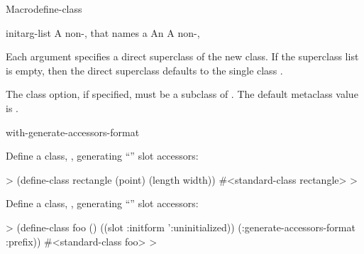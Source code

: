 \documentclass[10pt,twoside,english,pdftex]{article}
\begin{document}
\begin{functiondoc}{Macro}{define-class}
\fnterms
\begin{args}{initarg-list}
 A non-\nil,  that names a
 An 
 A non-\nil, 
\end{args}

\fndescription 
Each  argument specifies a direct superclass of
the new class. If the superclass list is empty, then the direct
superclass defaults to the single class .

%
The  class option, if specified, must be a subclass
of .  The default metaclass value is
.

\begin{alsos}{with-generate-accessors-format}
\end{alsos}

\fnexamples
Define a class, , generating ``'' slot accessors:
%
\W\supp
\begin{example}
  > (define-class rectangle (point)
      (length width))
  #<standard-class rectangle>
  >
\end{example}

Define a class, , generating
``'' slot accessors:
%
\W\supp
\begin{example}
  > (define-class foo ()
      ((slot :initform ':uninitialized))
      (:generate-accessors-format :prefix))
  #<standard-class foo>
  >
\end{example}

\end{functiondoc}

\end{document}
